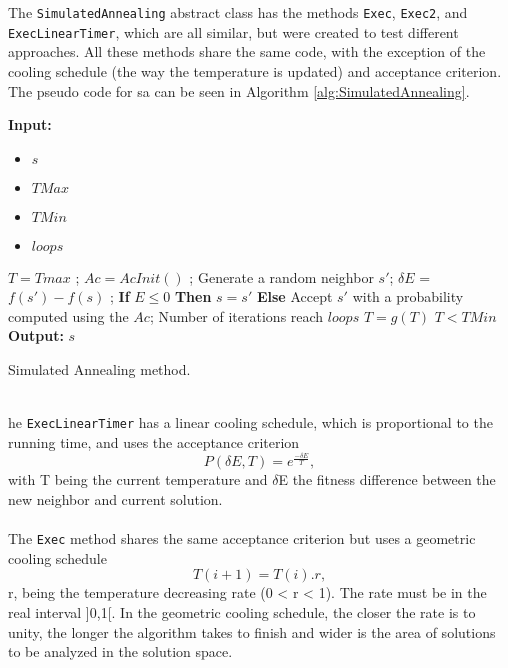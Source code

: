 The \verb+SimulatedAnnealing+ abstract class has the methods \verb+Exec+, \verb+Exec2+, and \verb+ExecLinearTimer+, which are all similar, but were created to test different approaches. All these methods share the same code, with the exception of the cooling schedule (the way the temperature is updated) and acceptance criterion. The pseudo code for \gls{sa} can be seen in Algorithm \ref{alg:SimulatedAnnealing}.\\
\begin{algorithm}[t!]
\textbf{Input:} 
\begin{itemize}
	\setlength{\itemsep}{1pt}
	\item $s$ 
	\item $TMax$ 
	\item $TMin$ 
	\item $loops$ 
\end{itemize}
\begin{algorithmic}
\State $T = Tmax$ ; 
\State $Ac = AcInit()$ ; 
\Repeat
	\Repeat	
		\State Generate a random neighbor $s'$;
		\State $\delta E$ = $f(s') - f(s)$ ;
		\State \textbf{If} $E \leq 0$ \textbf{Then} $s = s'$ 
		\State \textbf{Else} Accept $s'$ with a probability computed using the $Ac$;
	\Until Number of iterations reach $loops$
	\State $T = g(T )$ 
\Until $T < TMin$
\State \textbf{Output:} $s$ 
\end{algorithmic}
\caption{Simulated Annealing method.}
\label{alg:SimulatedAnnealing}
\end{algorithm}\\
he \verb+ExecLinearTimer+ has a linear cooling schedule, which is proportional to the running time, and uses the acceptance criterion
\begin{equation}
P(\delta E, T) = e^{\frac{-\delta E}{T}},
\end{equation} with T being the current temperature and $\delta$E the fitness difference between the new neighbor and current solution.\\
\\
The \verb+Exec+ method shares the same acceptance criterion but uses a geometric cooling schedule \begin{equation}
T (i+1) = T(i).r,
\end{equation}r, being the temperature decreasing rate (0 < r < 1). The rate must be in the real interval ]0,1[. In the geometric cooling schedule, the closer the rate is to unity, the longer the algorithm takes to finish and wider is the area of solutions to be analyzed in the solution space.\\
